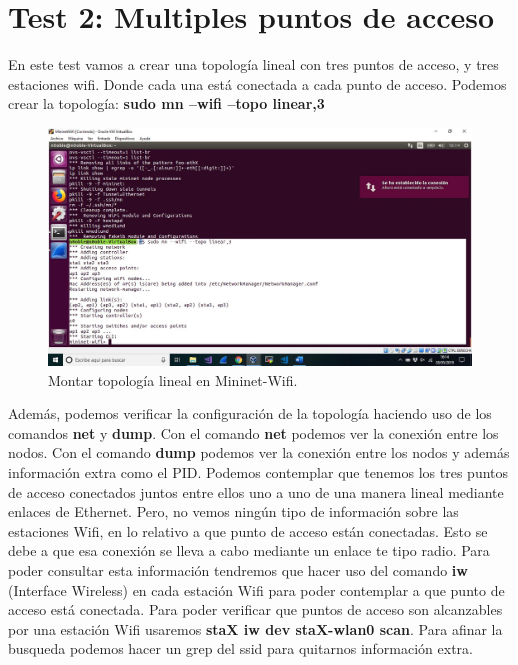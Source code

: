 \section{Test 2: Multiples puntos de acceso}
En este test vamos a crear una topología lineal con tres puntos de acceso, y tres estaciones wifi. Donde cada una está conectada a cada punto de acceso.\newline
\newline
Podemos crear la topología: \textbf{sudo mn --wifi --topo linear,3}
\newpage
\begin{figure}[!htb]
  \centering
    \includegraphics[width=\linewidth]{./img/test/9.JPG}
    \caption{Montar topología lineal en Mininet-Wifi.}
  \label{fig:yo}
\end{figure}
Además,  podemos  verificar la configuración de la topología haciendo uso de los comandos \textbf{net} y \textbf{dump}. Con el comando \textbf{net} podemos ver la conexión entre los nodos. Con el comando \textbf{dump} podemos ver la conexión entre los nodos y además información extra como el PID.\newline
\newline
Podemos contemplar que tenemos los tres puntos de acceso conectados juntos entre ellos uno a uno de una manera lineal mediante enlaces de Ethernet. Pero, no vemos ningún tipo de información sobre las estaciones Wifi, en lo relativo a que punto de acceso están conectadas. Esto se debe a que esa conexión se lleva a cabo mediante un enlace te tipo radio. Para poder consultar esta información tendremos que hacer uso del comando \textbf{iw} (Interface Wireless) en cada estación Wifi para poder contemplar a que punto de acceso está conectada. \newline
\newline
Para poder verificar que puntos de acceso son alcanzables por una estación Wifi usaremos \textbf{staX iw dev staX-wlan0 scan}. Para afinar la busqueda podemos hacer un grep del ssid para quitarnos información extra.\newline
